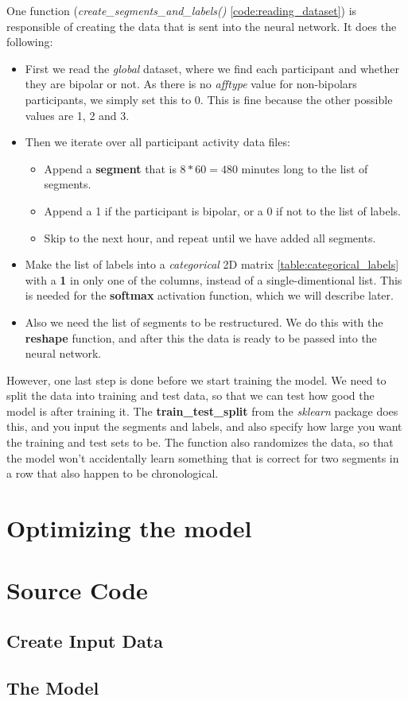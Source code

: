 One function (\textit{create\_segments\_and\_labels()} \ref{code:reading_dataset}) is responsible of creating the data that is sent into the neural network. 
It does the following:

\begin{itemize}
  \item First we read the \textit{global} dataset, where we find each participant and whether they are bipolar or not. As there is no \textit{afftype} value
        for non-bipolars participants, we simply set this to 0. This is fine because the other possible values are 1, 2 and 3.
  \item Then we iterate over all participant activity data files:
  \begin{itemize}
    \item Append a \textbf{segment} that is $ 8*60=480 $ minutes long to the list of segments.
    \item Append a 1 if the participant is bipolar, or a 0 if not to the list of labels.
    \item Skip to the next hour, and repeat until we have added all segments.
  \end{itemize}
  \item Make the list of labels into a \textit{categorical} 2D matrix \ref{table:categorical_labels} with a \textbf{1} in only one of the columns,
        instead of a single-dimentional list.
        This is needed for the \textbf{softmax} activation function, which we will describe later.
  \item Also we need the list of segments to be restructured. We do this with the \textbf{reshape} function, 
        and after this the data is ready to be passed into the neural network.
\end{itemize}

However, one last step is done before we start training the model. We need to split the data into training and test data, so that we can test how
good the model is after training it. The \textbf{train\_test\_split} from the \textit{sklearn} package does this, and you input the segments and labels,
and also specify how large  you want the training and test sets to be. The function also randomizes the data, so that the model won't accidentally 
learn something that is correct for two segments in a row that also happen to be chronological.

\section{Optimizing the model}

\newpage

\section{Source Code}
\subsection{Create Input Data}


\subsection{The Model}
